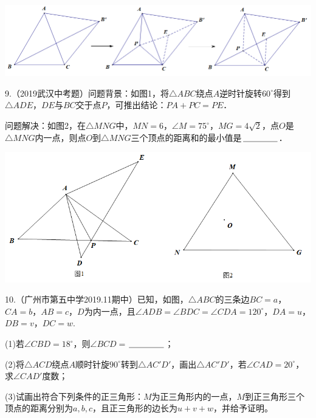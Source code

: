 \documentclass[10pt]{ctexart}
\begin{document}
\begin{center}
	\includegraphics[scale=0.5]{figure/feimadian12}
\end{center}

\begin{shaded}
9.（2019武汉中考题）问题背景：如图1，将$\triangle ABC$绕点$A$逆时针旋转$60^\circ$得到$\triangle ADE$，$DE$与$BC$交于点$P$，可推出结论：$PA+PC=PE$．

问题解决：如图2，在$\triangle MNG$中，$MN=6$，$\angle M=75^\circ$，$MG=4\sqrt{2}$，点$O$是$\triangle MNG$内一点，则点$O$到$\triangle MNG$三个顶点的距离和的最小值是$\underline{\hspace{1.5cm}}$．
\end{shaded}

\begin{center}
	\includegraphics[scale=0.5]{figure/feimadian26}
\end{center}

\begin{shaded}
10.（广州市第五中学2019.11期中）已知，如图，$\triangle ABC$的三条边$BC=a$，$CA=b$，$AB=c$，$D$为内一点，且$\angle ADB=\angle BDC=\angle CDA=120^\circ$，$DA=u$，$DB=v$，$DC=w$.

(1)若$\angle CBD=18^\circ$，则$\angle BCD=$$\underline{\hspace{1.5cm}}$；

(2)将$\triangle ACD$绕点$A$顺时针旋$90^\circ$转到$\triangle AC'D'$，画出$\triangle AC'D'$，若$\angle CAD=20^\circ$，求$\angle CAD'$度数；

(3)试画出符合下列条件的正三角形：$M$为正三角形内的一点，$M$到正三角形三个顶点的距离分别为$a,b,c$，且正三角形的边长为$u+v+w$，并给予证明。
\end{shaded}
\end{document}
